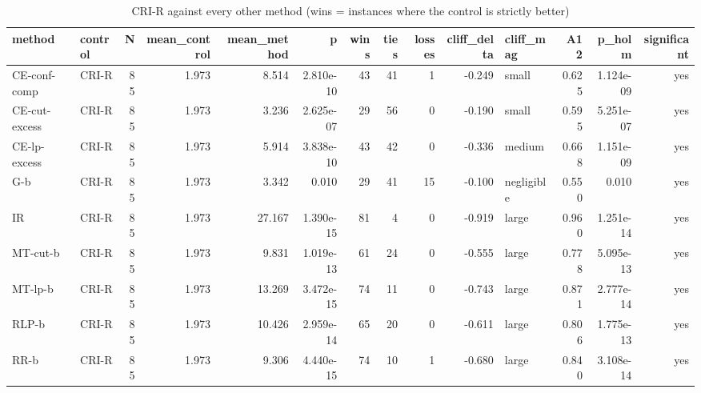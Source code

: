 \begin{table}[htbp]
\centering
\small
\caption{CRI-R against every other method (wins = instances where the control is strictly better)}
\label{tab:E2b_head_to_head_budgets_b10_vs_CRI-R}
\begin{tabular}{llrrrrrrrrlrrr}
\toprule
method & control & N & mean\_control & mean\_method & p & wins & ties & losses & cliff\_delta & cliff\_mag & A12 & p\_holm & significant \\
\midrule
CE-conf-comp & CRI-R & 85 & 1.973 & 8.514 & 2.810e-10 & 43 & 41 & 1 & -0.249 & small & 0.625 & 1.124e-09 & yes \\
CE-cut-excess & CRI-R & 85 & 1.973 & 3.236 & 2.625e-07 & 29 & 56 & 0 & -0.190 & small & 0.595 & 5.251e-07 & yes \\
CE-lp-excess & CRI-R & 85 & 1.973 & 5.914 & 3.838e-10 & 43 & 42 & 0 & -0.336 & medium & 0.668 & 1.151e-09 & yes \\
G-b & CRI-R & 85 & 1.973 & 3.342 & 0.010 & 29 & 41 & 15 & -0.100 & negligible & 0.550 & 0.010 & yes \\
IR & CRI-R & 85 & 1.973 & 27.167 & 1.390e-15 & 81 & 4 & 0 & -0.919 & large & 0.960 & 1.251e-14 & yes \\
MT-cut-b & CRI-R & 85 & 1.973 & 9.831 & 1.019e-13 & 61 & 24 & 0 & -0.555 & large & 0.778 & 5.095e-13 & yes \\
MT-lp-b & CRI-R & 85 & 1.973 & 13.269 & 3.472e-15 & 74 & 11 & 0 & -0.743 & large & 0.871 & 2.777e-14 & yes \\
RLP-b & CRI-R & 85 & 1.973 & 10.426 & 2.959e-14 & 65 & 20 & 0 & -0.611 & large & 0.806 & 1.775e-13 & yes \\
RR-b & CRI-R & 85 & 1.973 & 9.306 & 4.440e-15 & 74 & 10 & 1 & -0.680 & large & 0.840 & 3.108e-14 & yes \\
\bottomrule
\end{tabular}
\end{table}
